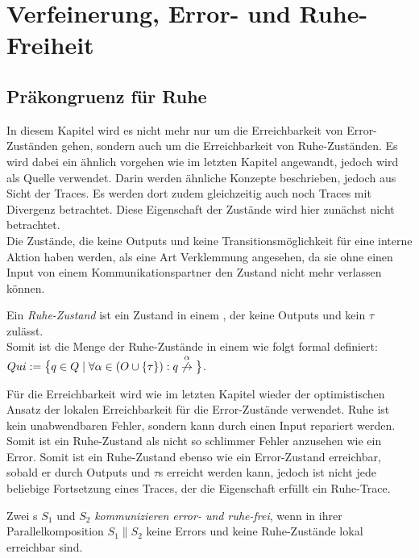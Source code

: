 \chapter{Verfeinerung, Error- und Ruhe-Freiheit}

\section{Präkongruenz für Ruhe}

In diesem Kapitel wird es nicht mehr nur um die Erreichbarkeit von
Error-Zuständen gehen, sondern auch um die Erreichbarkeit von
Ruhe-Zuständen. Es wird dabei ein ähnlich vorgehen wie im letzten Kapitel
angewandt, jedoch wird~\cite{Chilton2013} als Quelle verwendet. Darin werden ähnliche
Konzepte beschrieben, jedoch aus Sicht der Traces. Es werden dort zudem
gleichzeitig auch noch Traces mit Divergenz betrachtet. Diese Eigenschaft der
Zustände wird hier zunächst nicht betrachtet.\\
Die Zustände, die keine Outputs und keine Transitionsmöglichkeit für
eine interne Aktion haben werden, als eine Art Verklemmung angesehen, da sie
ohne einen Input von einem Kommunikationspartner den Zustand nicht mehr
verlassen können.

\begin{Def}[Ruhe]
  Ein \emph{Ruhe-Zustand} ist ein Zustand in einem \EIO{}, der keine
  Outputs und kein $\tau$ zulässt.\\
  Somit ist die Menge der Ruhe-Zustände in einem \EIO{} wie folgt formal
  definiert: $Qui:=\big\{q\in Q\mid \forall \alpha\in (O\cup \{\tau\}): q
  \overset{\alpha}{\not{\hspace{-0.1cm}\rightarrow}}\big\}$.
\end{Def}

Für die Erreichbarkeit wird wie im letzten Kapitel wieder der
optimistischen Ansatz der lokalen Erreichbarkeit für die Error-Zustände
verwendet. Ruhe ist kein unabwendbaren Fehler, sondern kann durch einen Input
repariert werden. Somit ist ein Ruhe-Zustand als nicht so \glqq{}schlimmer
Fehler\grqq{} anzusehen wie ein Error. Somit ist ein Ruhe-Zustand ebenso wie
ein Error-Zustand erreichbar, sobald er durch Outputs und $\tau$s erreicht
werden kann, jedoch ist nicht jede beliebige Fortsetzung eines Traces, der die
Eigenschaft erfüllt ein Ruhe-Trace.

\begin{Def}
  Zwei \EIO{}s $S_1$ und $S_2$ \emph{kommunizieren error- und ruhe-frei}, wenn
  in ihrer Parallelkomposition $S_1\| S_2$ keine Errors und keine Ruhe-Zustände
  lokal erreichbar sind.
\end{Def}

